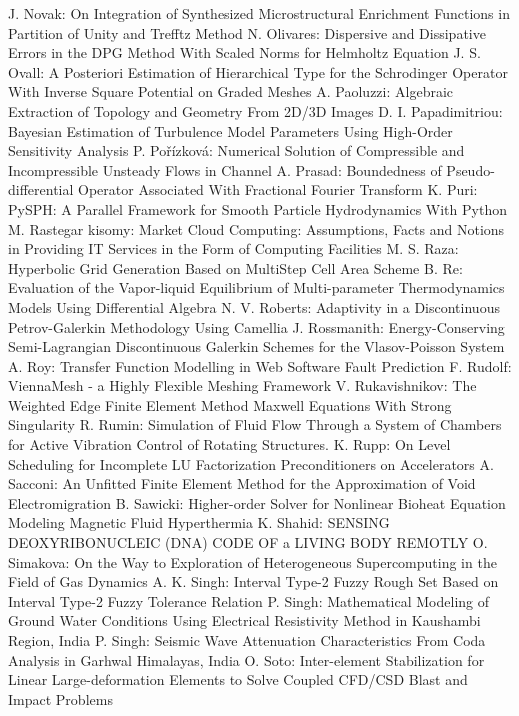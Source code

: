 \documentclass[10pt, A4]{article}%
\begin{document}
{J. Novak}: {On Integration of Synthesized Microstructural Enrichment Functions in Partition of Unity and Trefftz Method}
{N. Olivares}: {Dispersive and Dissipative Errors in the DPG Method With Scaled Norms for Helmholtz Equation}
{J. S. Ovall}: {A Posteriori Estimation of Hierarchical Type for the  Schrodinger Operator With Inverse Square Potential on Graded Meshes}
{A. Paoluzzi}: {Algebraic Extraction of Topology and Geometry From 2D/3D Images}
{D. I. Papadimitriou}: {Bayesian Estimation of Turbulence Model Parameters Using High-Order Sensitivity Analysis}
{P. Pořízková}: {Numerical Solution of Compressible and Incompressible Unsteady Flows in Channel}
{A. Prasad}: {Boundedness of Pseudo-differential Operator Associated With Fractional Fourier Transform}
{K. Puri}: {PySPH: A Parallel Framework for Smooth Particle Hydrodynamics With Python}
{M. Rastegar kisomy}: {Market Cloud Computing: Assumptions, Facts and Notions in Providing IT Services in the Form of Computing Facilities}
{M. S. Raza}: {Hyperbolic Grid Generation Based on MultiStep Cell Area Scheme}
{B. Re}: {Evaluation of the Vapor-liquid Equilibrium of Multi-parameter Thermodynamics Models Using Differential Algebra}
{N. V. Roberts}: {Adaptivity in a Discontinuous Petrov-Galerkin Methodology Using Camellia}
{J. Rossmanith}: {Energy-Conserving Semi-Lagrangian Discontinuous Galerkin Schemes for the Vlasov-Poisson System}
{A. Roy}: {Transfer Function Modelling in Web Software Fault Prediction}
{F. Rudolf}: {ViennaMesh - a Highly Flexible Meshing Framework}
{V. Rukavishnikov}: {The Weighted Edge Finite Element Method Maxwell Equations With Strong Singularity}
{R. Rumin}: {Simulation of Fluid Flow Through a System of Chambers for Active Vibration Control of Rotating Structures.}
{K. Rupp}: {On Level Scheduling for Incomplete LU Factorization Preconditioners on Accelerators}
{A. Sacconi}: {An Unfitted Finite Element Method for the Approximation of Void Electromigration}
{B. Sawicki}: {Higher-order Solver for Nonlinear Bioheat Equation Modeling Magnetic Fluid Hyperthermia}
{K. Shahid}: {SENSING DEOXYRIBONUCLEIC (DNA) CODE OF a LIVING BODY REMOTLY}
{O. Simakova}: {On the Way to Exploration of Heterogeneous Supercomputing in the Field of Gas Dynamics}
{A. K. Singh}: {Interval Type-2 Fuzzy Rough Set Based on Interval Type-2 Fuzzy Tolerance Relation}
{P. Singh}: {Mathematical Modeling of Ground Water Conditions Using Electrical Resistivity Method in Kaushambi Region, India}
{P. Singh}: {Seismic Wave Attenuation Characteristics  From Coda Analysis in Garhwal Himalayas, India}
{O. Soto}: {Inter-element Stabilization for Linear Large-deformation Elements to Solve Coupled CFD/CSD Blast and Impact Problems}
\end{document}
